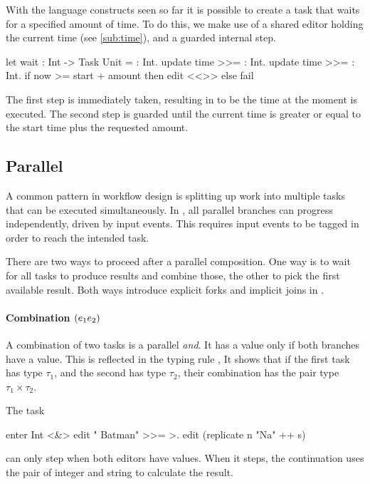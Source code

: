 \begin{example}[Waiting]\label{exm:wait}

With the language constructs seen so far it is possible to create a task that waits for a specified amount of time.
To do this,
we make use of a shared editor holding the current time (see \cref{sub:time}),
and a guarded internal step.
\begin{TASK}
  let wait : Int -> Task Unit = \amount : Int.
    update time >>= \start : Int.
    update time >>= \now : Int.
      if now >= start + amount then edit <<>> else fail
\end{TASK}
The first step is immediately taken, resulting in  to be the time at the moment  is executed.
The second step is guarded until the current time is greater or equal to the start time plus the requested amount.

\end{example}



\subsection{Parallel}

A common pattern in workflow design is splitting up work into multiple tasks that can be executed simultaneously.
In \TOPHAT, all parallel branches can progress independently, driven by input events.
This requires input events to be tagged in order to reach the intended task.

There are two ways to proceed after a parallel composition.
One way is to wait for all tasks to produce results and combine those,
the other to pick the first available result.
Both ways introduce explicit forks and implicit joins in \TOPHAT.


\paragraph{Combination $(e_1 \relax e_2)$}

A combination of two tasks is a parallel \emph{and}.
It has a value only if both branches have a value.
This is reflected in the typing rule ,
It shows that if the first task has type $\tau_1$,
and the second has type $\tau_2$,
their combination has the pair type $\tau_1 \times \tau_2$.



\begin{example}[Combining]

The task
\begin{TASK}
  enter Int <&> edit " Batman" >>= >. edit (replicate n "Na" ++ s)
\end{TASK}
can only step when both editors have values.
When it steps, the continuation uses the pair of integer and string to calculate the result.

\end{example}


